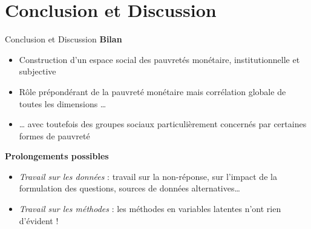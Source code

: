 \documentclass[10pt,xcolor=table,color={dvipsnames,usenames},ignorenonframetext,usepdftitle=false,french]{beamer}
\providecommand{\tightlist}{%
  \setlength{\parskip}{0pt}
  }
\begin{document}
\hypertarget{conclusion-et-discussion}{%
\section*{Conclusion et Discussion}\label{conclusion-et-discussion}}

\begin{frame}{Conclusion et Discussion}
\textbf{Bilan}

\begin{itemize}
\tightlist
\item
  Construction d'un espace social des pauvretés monétaire,
  institutionnelle et subjective
\item
  Rôle prépondérant de la pauvreté monétaire mais corrélation globale de
  toutes les dimensions \ldots{}
\item
  \ldots{} avec toutefois des groupes sociaux particulièrement concernés
  par certaines formes de pauvreté
\end{itemize}

\pause

\bigskip

\textbf{Prolongements possibles}

\begin{itemize}
\item
  \emph{Travail sur les données} : travail sur la non-réponse, sur
  l'impact de la formulation des questions, sources de données
  alternatives\ldots{}
\item
  \emph{Travail sur les méthodes} : les méthodes en variables latentes
  n'ont rien d'évident !
\end{itemize}
\end{frame}
\end{document}

